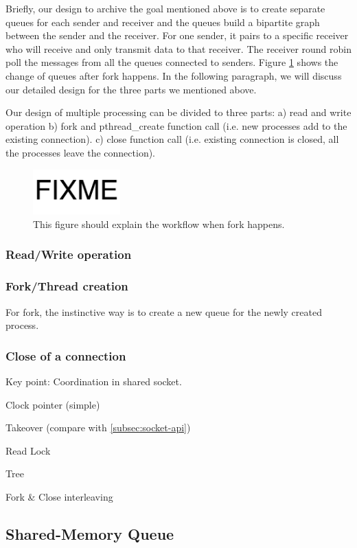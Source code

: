 Briefly, our design to archive the goal mentioned above is to create separate queues for each sender and receiver and the queues build a bipartite graph between the sender and the receiver. For one sender, it pairs to a specific receiver who will receive and only transmit data to that receiver. The receiver round robin poll the messages from all the queues connected to senders. Figure \ref{fig:fork-process} shows the change of queues after fork happens. In the following paragraph, we will discuss our detailed design for the three parts we mentioned above.

Our design of multiple processing can be divided to three parts: a) read and write operation b) fork and pthread\_create function call (i.e. new processes add to the existing connection). c) close function call (i.e. existing connection is closed, all the processes leave the connection).


\begin{figure}[t]
	\centering
	\includegraphics[width=0.3\textwidth]{images/fixme}
	\caption{This figure should explain the workflow when fork happens.}
	\label{fig:fork-process}
\end{figure}
\subsubsection{Read/Write operation}
\subsubsection{Fork/Thread creation}
For fork, the instinctive way is to create a new queue for the newly created process. 
\subsubsection{Close of a connection}
  
Key point: Coordination in shared socket.

Clock pointer (simple)

Takeover (compare with \ref{subsec:socket-api})

Read Lock

Tree

Fork \& Close interleaving

\subsection{Shared-Memory Queue}


